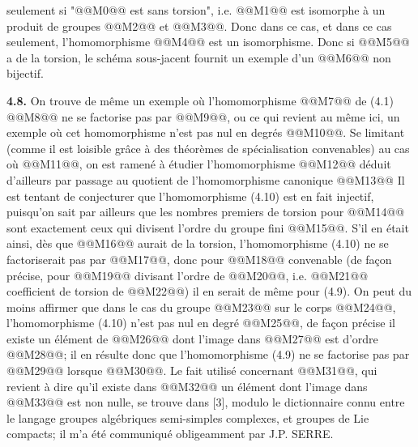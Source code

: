
seulement si "@@M0@@ est sans torsion", i.e. @@M1@@ est isomorphe à un produit de groupes @@M2@@ et @@M3@@. Donc dans ce cas, et dans ce cas seulement, l'homomorphisme
@@M4@@
est un isomorphisme. Donc si @@M5@@ a de la torsion, le schéma sous-jacent fournit un exemple d'un @@M6@@ non bijectif.

\textbf{4.8.} On trouve de même un exemple où l'homomorphisme @@M7@@ de (4.1)
@@M8@@
ne se factorise pas par @@M9@@, ou ce qui revient au même ici, un exemple où cet homomorphisme n'est pas nul en degrés @@M10@@. Se limitant (comme il est loisible grâce à des théorèmes de spécialisation convenables) au cas où @@M11@@, on est ramené à étudier l'homomorphisme
@@M12@@
déduit d'ailleurs par passage au quotient de l'homomorphisme canonique
@@M13@@
Il est tentant de conjecturer que l'homomorphisme (4.10) est en fait injectif, puisqu'on sait par ailleurs que les nombres premiers de torsion pour @@M14@@ sont exactement ceux qui divisent l'ordre du groupe fini @@M15@@. S'il en était ainsi, dès que @@M16@@ aurait de la torsion, l'homomorphisme (4.10) ne se factoriserait pas par @@M17@@, donc pour @@M18@@ convenable (de façon précise, pour @@M19@@ divisant l'ordre de @@M20@@, i.e. @@M21@@ coefficient de torsion de @@M22@@) il en serait de même pour (4.9). On peut du moins affirmer que dans le cas du groupe @@M23@@ sur le corps @@M24@@, l'homomorphisme (4.10) n'est pas nul en degré @@M25@@, de façon précise il existe un élément de @@M26@@ dont l'image dans @@M27@@ est d'ordre @@M28@@; il en résulte donc que l'homomorphisme (4.9) ne se factorise pas par @@M29@@ lorsque @@M30@@. Le fait utilisé concernant @@M31@@, qui revient à dire qu'il existe dans @@M32@@ un élément dont l'image dans @@M33@@ est non nulle, se trouve dans [3], modulo le dictionnaire connu entre le langage groupes algébriques semi-simples complexes, et groupes de Lie compacts; il m'a été communiqué obligeamment par J.P. SERRE.

